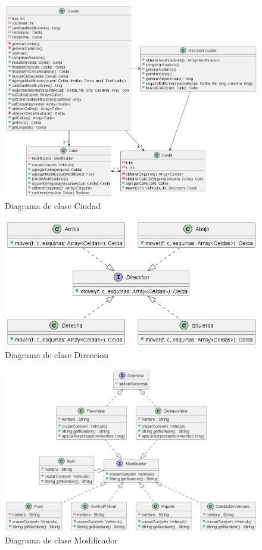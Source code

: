 \documentclass[titlepage,a4paper]{article}
\begin{document}
\begin{figure}[H]
  \centering
  \includegraphics[width=1\textwidth]{diagramas/diagrama-ciudad.png}
  \caption{\label{fig:seq02} Diagrama de clase Ciudad}
\end{figure}


\begin{figure}[H]
  \centering
  \includegraphics[width=1\textwidth]{diagramas/interface-direccion.png}
  \caption{\label{fig:seq03} Diagrama de clase Direccion}
\end{figure}

\begin{figure}[H]
  \centering
  \includegraphics[width=1\textwidth]{diagramas/interface-modificador-sorpresa.png}
  \caption{\label{fig:seq04} Diagrama de clase Modificador}
\end{figure}
\end{document}
